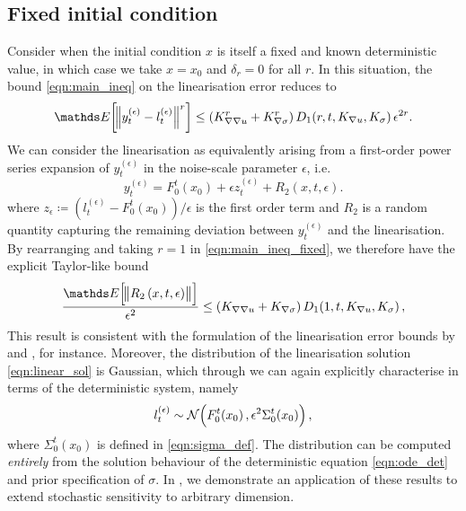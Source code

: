 \subsection{Fixed initial condition}\label{sec:theory_fixed}
Consider when the initial condition \(x\) is itself a fixed and known deterministic value, in which case we take \(x = x_0\) and \(\delta_r = 0\) for all \(r\).
In this situation, the bound \cref{eqn:main_ineq} on the linearisation error reduces to
\begin{equation}
	\avg{\norm{y_t^{(\epsilon)} - l_t^{(\epsilon)}}^r} \leq \left(K_{\nabla\nabla u}^r + K_{\nabla\sigma}^r\right)D_1\!\left(r,t, K_{\nabla u}, K_\sigma\right)\epsilon^{2r}.
	\label{eqn:main_ineq_fixed}
\end{equation}
We can consider the linearisation as equivalently arising from a first-order power series expansion of \(y_t^{(\epsilon)}\) in the noise-scale parameter \(\epsilon\), i.e.
\[
	y_t^{(\epsilon)} = F_0^t\!\left(x_0\right) + \epsilon z_t^{(\epsilon)} + R_2\left(x,t,\epsilon\right).
\]
where \(z_\epsilon \coloneqq \left(l_{t}^{(\epsilon)} - F_0^t\!\left(x_0\right)\right) / \epsilon\) is the first order term and \(R_2\) is a random quantity capturing the remaining deviation between \(y_t^{(\epsilon)}\) and the linearisation.
By rearranging and taking \(r = 1\) in \cref{eqn:main_ineq_fixed}, we therefore have the explicit Taylor-like bound
\[
	\frac{\avg{\norm{R_2\left(x,t,\epsilon\right)}}}{\epsilon^2} \leq \left(K_{\nabla \nabla u} + K_{\nabla\sigma}\right)D_1\!\left(1,t, K_{\nabla u}, K_\sigma\right),
\]
This result is consistent with the formulation of the linearisation error bounds by \citet{Blagoveshchenskii_1962_DiffusionProcessesDepending} and \citet{FreidlinWentzell_1998_RandomPerturbationsDynamical}, for instance.
Moreover, the distribution of the linearisation solution \cref{eqn:linear_sol} is Gaussian, which through  we can again explicitly characterise in terms of the deterministic system, namely
\begin{equation}
	l_t^{(\epsilon)} \sim\mathcal{N}\!\left(F_0^t\!\left(x_0\right), \epsilon^2 \Sigma_0^t\!\left(x_0\right)\right),
	\label{eqn:linear_gauss_sol}
\end{equation}
where \(\Sigma_0^t\!\left(x_0\right)\) is defined in \cref{eqn:sigma_def}.
The distribution can be computed \emph{entirely} from the solution behaviour of the deterministic equation \cref{eqn:ode_det} and prior specification of \(\sigma\).
In , we demonstrate an application of these results to extend stochastic sensitivity \citep{Balasuriya_2020_StochasticSensitivityComputable} to arbitrary dimension.


